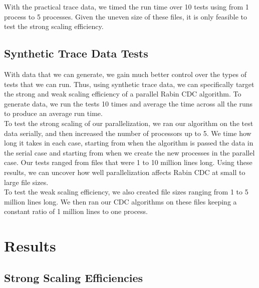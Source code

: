 \documentclass{acmtog} %
\begin{document}
	With the practical trace data, we timed the run time over 10 tests using from 1 process to 5 processes. Given the uneven size of these files, it is only feasible to test the strong scaling efficiency.
	\subsection{Synthetic Trace Data Tests}
	With data that we can generate, we gain much better control over the types of tests that we can run. Thus, using synthetic trace data, we can specifically target the strong and weak scaling efficiency of a parallel Rabin CDC algorithm. To generate data, we run the tests 10 times and average the time across all the runs to produce an average run time. \\
	
	To test the strong scaling of our parallelization, we ran our algorithm on the test data serially, and then increased the number of processors up to 5. We time how long it takes in each case, starting from when the algorithm is passed the data in the serial case and starting from when we create the new processes in the parallel case. Our tests ranged from files that were 1 to 10 million lines long. Using these results, we can uncover how well parallelization affects Rabin CDC at small to large file sizes.\\
	
	To test the weak scaling efficiency, we also created file sizes ranging from 1 to 5 million lines long. We then ran our CDC algorithms on these files keeping a constant ratio of 1 million lines to one process. \\ 
	
	\section{Results}
	\subsection{Strong Scaling Efficiencies}
\end{document}
